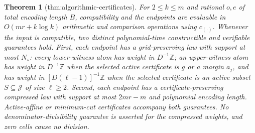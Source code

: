 \documentclass{article}
\newtheorem{theorem}{Theorem}
\begin{document}
\begin{theorem}[thm:algorithmic-certificates]\label{thm:algorithmic-certificates}
For \(2\leq k\leq m\) and rational \(o,e\) of total encoding length \(B\), compatibility and the endpoints are evaluable in \(O(mr+k\log k)\) arithmetic and comparison operations using \(c_{(\cdot)}\).  Whenever the input is compatible, two distinct polynomial-time constructible and verifiable guarantees hold.  First, each endpoint has a grid-preserving law with support at most \(N_\star\): every lower-witness atom has weight in \(D^{-1}\mathbb Z\); an upper-witness atom has weight in \(D^{-1}\mathbb Z\) when the selected active certificate is \(g\) or a margin \(a_j\), and has weight in \([D(\ell-1)]^{-1}\mathbb Z\) when the selected certificate is an active subset \(S\subseteq\mathcal J\) of size \(\ell\geq2\).  Second, each endpoint has a certificate-preserving compressed law with support at most \(2mr-m\) and polynomial encoding length.  Active-affine or minimum-cut certificates accompany both guarantees.  No denominator-divisibility guarantee is asserted for the compressed weights, and zero cells cause no division.
\end{theorem}
\end{document}
